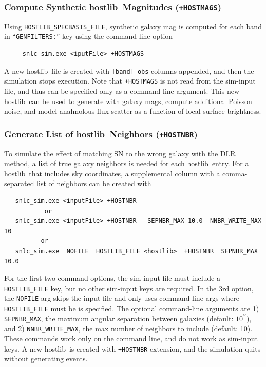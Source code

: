 \documentclass[12pt]{article}
\newcommand{\hostlib}{{\sc hostlib}}
\begin{document}
{%
\subsubsection{Compute Synthetic \hostlib\ Magnitudes ({\tt +HOSTMAGS})}
\label{sss:hostlib_synmag}

Using {\tt HOSTLIB\_SPECBASIS\_FILE}, synthetic galaxy mag is 
computed for each band in ``{\tt GENFILTERS:}'' key
using the command-line option
\begin{verbatim}
     snlc_sim.exe <iputFile> +HOSTMAGS
\end{verbatim}
A new \hostlib\ file is created with {\tt [band]\_obs} columns appended,
and then the simulation stops execution.
Note that {\tt +HOSTMAGS} is not read from the sim-input file, 
and thus can be specified only as a command-line argument.
This new \hostlib\ can be used to generate with galaxy mags,
compute additional Poisson noise, and model analmolous 
flux-scatter as a function of local surface brightness.

\subsubsection{Generate List of \hostlib\ Neighbors ({\tt +HOSTNBR})}
\label{sss:hostlib_NBR}

To simulate the effect of matching SN to the wrong galaxy 
with the DLR method,
a list of true galaxy neighbors is needed for each \hostlib\ entry. 
For a \hostlib\ that includes sky coordinates, a supplemental 
column with a comma-separated list of neighbors can be created with
%
\begin{verbatim}
   snlc_sim.exe <inputFile> +HOSTNBR
           or
   snlc_sim.exe <inputFile> +HOSTNBR   SEPNBR_MAX 10.0  NNBR_WRITE_MAX 10
          or 
   snlc_sim.exe  NOFILE  HOSTLIB_FILE <hostlib>  +HOSTNBR  SEPNBR_MAX 10.0 
\end{verbatim}
%
For the first two command options, the sim-input file must include a {\tt HOSTLIB\_FILE} key,
but no other sim-input keys are required. In the 3rd option, the {\tt NOFILE} arg 
skips the input file and only uses command line args where \verb|HOSTLIB_FILE|
must be is specified.
The optional command-line arguments are 
1) \verb|SEPNBR_MAX|, the maximum angular separation between galaxies
  (default: $10^{\prime\prime}$), and
2) \verb|NNBR_WRITE_MAX|, the max number of neighbors to include
  (default: 10).
These commands work only on the command line, and do not work
as sim-input keys. A new \hostlib\ is created with {\tt +HOSTNBR}
extension, and the simulation quits without generating events.

}
\end{document}
